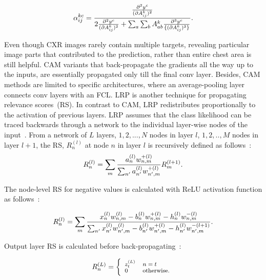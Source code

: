 \documentclass[conference]{IEEEtran}
\begin{document}
\begin{equation}
\scriptsize{
    \alpha_{ij}^{kc}=\frac{\frac{\partial^2y^c}{(\partial A_{ij}^k)^2}}{2\frac{\partial^2y^c}{(\partial A_{ij}^k)^2}+\sum_{a}\sum_{b}A_{ab}^k{\frac{\partial^3y^c}{\{(\partial A_{ij}^k)^3\}}}}.}
    \label{eq:w}
\end{equation}
\vspace{-2mm}

Even though CXR images rarely contain multiple targets, revealing particular image parts that contributed to the prediction, rather than entire chest area is still helpful. CAM variants that back-propagate the gradients all the way up to the inputs, are essentially propagated only till the final conv layer. Besides, CAM methods are limited to specific architectures, where an average-pooling layer connects conv layers with an FCL. LRP is another technique for propagating relevance scores~(RS). In contrast to CAM, LRP redistributes proportionally to the activation of previous layers. LRP assumes that the class likelihood can be traced backwards through a network to the individual layer-wise nodes of the input~\cite{LRP2}. From a network of $L$ layers, $1,2,...,N$ nodes in layer $l$, $1,2,..,M$ nodes in layer $l+1$, the RS, $R_{n}^{(l)}$ at node $n$ in layer $l$ is recursively defined as follows~\cite{LRP2}:   
\begin{equation}
\scriptsize{
    R_{n}^{(l)}=\sum_{m} \frac{a_{n}^{(l)} w_{n, m}^{+(l)}}{\sum_{n^{\prime}} a_{n^{\prime}}^{(l)} w_{n^{\prime}, m}^{+(l)}} R_{m}^{(l+1)}.}
\end{equation}
\vspace{-2mm}

The node-level RS for negative values is calculated with ReLU activation function as follows~\cite{LRP2}:

\vspace{-2mm}
\begin{equation}
\scriptsize{
    R_{n}^{(l)}=\sum_{m} \frac{x_{n}^{(l)} w_{n, m}^{(l)}-b_{n}^{(l)} w_{n, m}^{+(l)}-h_{n}^{(l)} w_{n, m}^{-(l)}}{\sum_{n^{\prime}} x_{n^{\prime}}^{(l)} w_{n^{\prime}, m}^{(l)}-b_{n^{\prime}}^{(l)} w_{n^{\prime}, m}^{+(l)}-h_{n^{\prime}}^{(l)} w_{n^{\prime}, m}^{-(l+1)}}.}
\end{equation}
\vspace{-2mm}

\noindent Output layer RS is calculated before  back-propagating~\cite{LRP2}:

\vspace{-2mm}
\begin{equation}
\scriptsize{
    R_{n}^{(L)}=\left\{\begin{array}{ll}
    {z_{t}^{(L)}} & {n=t} \\
    {0} & {\text {otherwise.}}
    \end{array}\right.}
\end{equation}
\vspace{-2mm}
\end{document}
